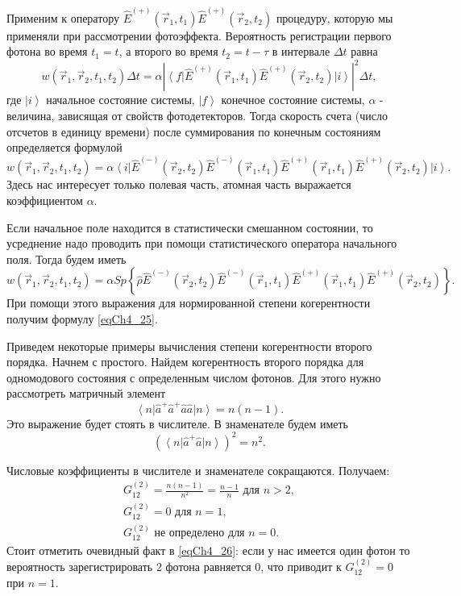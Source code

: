 Применим к оператору $\hat{E}^{(+)}\left(\vec{r}_1, t_1\right)\hat{E}^{(+)}\left(\vec{r}_2,
t_2\right)$ процедуру, которую мы применяли при рассмотрении
фотоэффекта. Вероятность регистрации первого фотона во время $t_1 =
t$, а второго во время $t_2 = t - \tau$ в интервале $\Delta t$ равна
\begin{equation}
w\left(\vec{r}_1, \vec{r}_2, t_1, t_2\right) \Delta t= 
\alpha \left| \left<f\right|
\hat{E}^{(+)}\left(\vec{r}_1, t_1\right)\hat{E}^{(+)}\left(\vec{r}_2,
t_2\right)
\left|i\right>\right|^2 \Delta t,
\nonumber
\end{equation}
где $\left|i\right>$ начальное состояние системы, $\left|f\right>$
конечное состояние системы, $\alpha$ - величина, зависящая от свойств
фотодетекторов. Тогда скорость счета (число отсчетов в единицу
времени) после суммирования по конечным состояниям определяется
формулой
\begin{equation}
w\left(\vec{r}_1, \vec{r}_2, t_1, t_2\right) = 
\alpha \left<i\right|
\hat{E}^{(-)}\left(\vec{r}_2, t_2\right)\hat{E}^{(-)}\left(\vec{r}_1,
t_1\right)
\hat{E}^{(+)}\left(\vec{r}_1, t_1\right)\hat{E}^{(+)}\left(\vec{r}_2,
t_2\right)
\left|i\right>.
\nonumber
\end{equation}
Здесь нас интересует только полевая часть, атомная часть выражается
коэффициентом $\alpha$.

Если начальное поле находится в статистически смешанном состоянии, то
усреднение надо проводить при помощи статистического оператора
начального поля. Тогда будем иметь
\begin{equation}
w\left(\vec{r}_1, \vec{r}_2, t_1, t_2\right) = 
\alpha Sp \left\{\hat{\rho}
\hat{E}^{(-)}\left(\vec{r}_2, t_2\right)\hat{E}^{(-)}\left(\vec{r}_1,
t_1\right)
\hat{E}^{(+)}\left(\vec{r}_1, t_1\right)\hat{E}^{(+)}\left(\vec{r}_2,
t_2\right)
\right\}.
\nonumber
\end{equation}
При помощи этого выражения для нормированной степени
когерентности получим формулу \eqref{eqCh4_25}.

Приведем некоторые примеры вычисления
степени когерентности второго порядка. Начнем с простого. Найдем
когерентность второго порядка для одномодового состояния с
определенным числом фотонов. Для этого нужно рассмотреть матричный
элемент  
\[
\left<n\right|\hat{a}^{+}\hat{a}^{+}\hat{a}\hat{a}\left|n\right> = n
\left(n - 1\right).
\]
Это выражение будет стоять в числителе. В знаменателе будем иметь 
\[
\left(\left<n\right|\hat{a}^{+}\hat{a}\left|n\right>\right)^2 = 
n^2.
\]

Числовые коэффициенты в числителе и знаменателе сокращаются. Получаем:
\begin{eqnarray}
G^{(2)}_{12} = \frac{n\left(n - 1\right)}{n^2} = \frac{n - 1}{n} 
\mbox{ для } n > 2,
\nonumber \\
G^{(2)}_{12} = 0
\mbox{ для } n = 1,
\nonumber \\
G^{(2)}_{12} 
\mbox{ не определено для } n = 0.
\label{eqCh4_26}
\end{eqnarray}
Стоит отметить очевидный факт в \eqref{eqCh4_26}: если у нас имеется
один фотон то вероятность зарегистрировать 2 фотона равняется 0, что
приводит к $G^{(2)}_{12} = 0$ при $n=1$.

